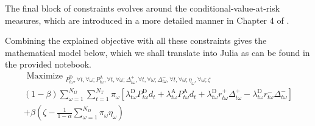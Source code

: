 The final block of constraints evolves around the conditional-value-at-risk measures, which are introduced in a more detailed manner in Chapter 4 of \cite{Conejo10}.

Combining the explained objective with all these constraints gives the mathematical model below, which we shall translate into Julia as can be found in the provided notebook.  
\begin{equation}
\begin{array}{c}
\text { Maximize }_{P_{t \omega}^{\mathrm{D}}, \forall t, \forall \omega ; P_{t \omega}^{\mathrm{A}}, \forall t, \forall \omega ; \Delta_{t \omega}^{+}, \forall t, \forall \omega ; \Delta_{t \omega}^{-}, \forall t, \forall \omega ; \eta_{\omega}, \forall \omega ; \zeta} \\
(1-\beta)\sum_{\omega=1}^{N_{\Omega}} \sum_{t=1}^{N_{\mathrm{T}}} \pi_{\omega}\left[\lambda_{t \omega}^{\mathrm{D}} P_{t \omega}^{\mathrm{D}} d_{t}+\lambda_{t \omega}^{\mathrm{A}} P_{t \omega}^{\mathrm{A}} d_{t}+\lambda_{t \omega}^{\mathrm{D}} r_{t \omega}^{+} \Delta_{t \omega}^{+}-\lambda_{t \omega}^{\mathrm{D}} r_{t \omega}^{-} \Delta_{t \omega}^{-}\right] 
\\+\beta\left(\zeta-\frac{1}{1-\alpha} \sum_{\omega=1}^{N_{\Omega}} \pi_{\omega} \eta_{\omega}\right)
\end{array}
\end{equation} 
